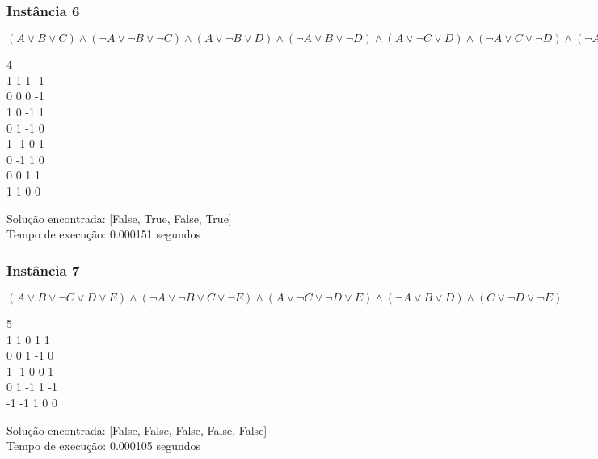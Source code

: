 \documentclass[12pt]{article}
\begin{document}
    
    \subsubsection{Instância 6}
        \((A \lor B \lor C) \land (\neg A \lor \neg B \lor \neg C) \land (A \lor \neg B \lor D) \land (\neg A \lor B \lor \neg D) \land (A \lor \neg C \lor D) \land (\neg A \lor C \lor \neg D) \land (\neg A \lor \neg B \lor C \lor D) \land (A \lor B \lor \neg C \lor \neg D)\)
        \begin{tcolorbox}[title=Entrada da instância 6, width=\linewidth, fontupper=\ttfamily,  halign=flush left]
            4 \\
            1 1 1 -1 \\
            0 0 0 -1 \\
            1 0 -1 1 \\
            0 1 -1 0 \\
            1 -1 0 1 \\
            0 -1 1 0 \\
            0 0 1 1 \\
            1 1 0 0 \\
        \end{tcolorbox}
        \begin{tcolorbox}[title=Saída da instância 6, width=\linewidth, fontupper=\ttfamily, halign=flush left]
            Solução encontrada: [False, True, False, True] \\
            Tempo de execução: 0.000151 segundos
        \end{tcolorbox}
    
    \subsubsection{Instância 7}
        \((A \lor B \lor \neg C \lor D \lor E) \land (\neg A \lor \neg B \lor C \lor \neg E) \land (A \lor \neg C \lor \neg D \lor E) \land (\neg A \lor B \lor D) \land (C \lor \neg D \lor \neg E)\)
        \begin{tcolorbox}[title=Entrada da instância 7, width=\linewidth, fontupper=\ttfamily,  halign=flush left]
            5 \\
            1 1 0 1 1 \\
            0 0 1 -1 0 \\
            1 -1 0 0 1 \\
            0 1 -1 1 -1 \\
            -1 -1 1 0 0 \\
        \end{tcolorbox}
        \begin{tcolorbox}[title=Saída da instância 7, width=\linewidth, fontupper=\ttfamily, halign=flush left]
            Solução encontrada: [False, False, False, False, False] \\
            Tempo de execução: 0.000105 segundos
        \end{tcolorbox}
\end{document}
